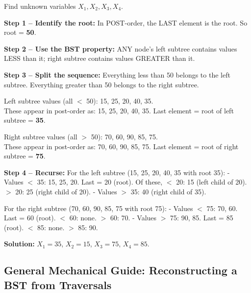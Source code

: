 \documentclass[12pt,portrait]{article}
\begin{document}
\begin{rulebox}
Find unknown variables $X_1, X_2, X_3, X_4$.

\textbf{Step 1 -- Identify the root:} In POST-order, the LAST element is the root. So root = \textbf{50}.

\textbf{Step 2 -- Use the BST property:} ANY node's left subtree contains values LESS than it; right subtree contains values GREATER than it.

\textbf{Step 3 -- Split the sequence:} Everything less than 50 belongs to the left subtree. Everything greater than 50 belongs to the right subtree.

Left subtree values (all $<$ 50): 15, 25, 20, 40, 35.\\
These appear in post-order as: 15, 25, 20, 40, 35. Last element = root of left subtree = \textbf{35}.

Right subtree values (all $>$ 50): 70, 60, 90, 85, 75.\\
These appear in post-order as: 70, 60, 90, 85, 75. Last element = root of right subtree = \textbf{75}.

\textbf{Step 4 -- Recurse:} For the left subtree (15, 25, 20, 40, 35 with root 35):
- Values $<$ 35: 15, 25, 20. Last = 20 (root). Of these, $<$ 20: 15 (left child of 20). $>$ 20: 25 (right child of 20).
- Values $>$ 35: 40 (right child of 35).

For the right subtree (70, 60, 90, 85, 75 with root 75):
- Values $<$ 75: 70, 60. Last = 60 (root). $<$ 60: none. $>$ 60: 70.
- Values $>$ 75: 90, 85. Last = 85 (root). $<$ 85: none. $>$ 85: 90.

\textbf{Solution:} $X_1 = 35$, $X_2 = 15$, $X_3 = 75$, $X_4 = 85$.
\end{rulebox}

\subsection{General Mechanical Guide: Reconstructing a BST from Traversals}
\end{document}
